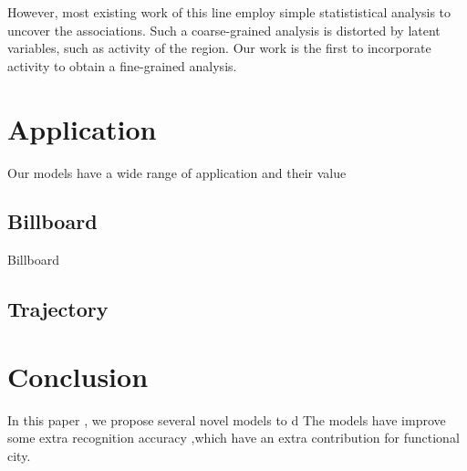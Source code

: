 \documentclass{llncs}
\begin{document}
However, most existing work of this line employ simple statististical analysis to uncover the associations. 
Such a coarse-grained analysis is distorted by latent variables, such as activity of the region.
Our work is the first to incorporate activity to obtain a fine-grained analysis.


\section{Application}
Our models have a wide range of application and their value

\subsection{Billboard}
Billboard

\subsection{Trajectory}

\section{Conclusion}
In this paper , we propose several novel models to d
The models have improve some extra recognition accuracy ,which have an extra contribution for functional city.
\end{document}

